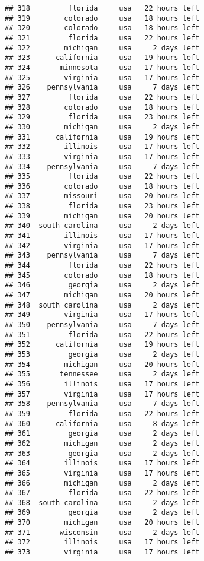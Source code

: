 \documentclass[
]{article}
\begin{document}
\begin{verbatim}
## 318         florida     usa   22 hours left
## 319        colorado     usa   18 hours left
## 320        colorado     usa   18 hours left
## 321         florida     usa   22 hours left
## 322        michigan     usa     2 days left
## 323      california     usa   19 hours left
## 324       minnesota     usa   17 hours left
## 325        virginia     usa   17 hours left
## 326    pennsylvania     usa     7 days left
## 327         florida     usa   22 hours left
## 328        colorado     usa   18 hours left
## 329         florida     usa   23 hours left
## 330        michigan     usa     2 days left
## 331      california     usa   19 hours left
## 332        illinois     usa   17 hours left
## 333        virginia     usa   17 hours left
## 334    pennsylvania     usa     7 days left
## 335         florida     usa   22 hours left
## 336        colorado     usa   18 hours left
## 337        missouri     usa   20 hours left
## 338         florida     usa   23 hours left
## 339        michigan     usa   20 hours left
## 340  south carolina     usa     2 days left
## 341        illinois     usa   17 hours left
## 342        virginia     usa   17 hours left
## 343    pennsylvania     usa     7 days left
## 344         florida     usa   22 hours left
## 345        colorado     usa   18 hours left
## 346         georgia     usa     2 days left
## 347        michigan     usa   20 hours left
## 348  south carolina     usa     2 days left
## 349        virginia     usa   17 hours left
## 350    pennsylvania     usa     7 days left
## 351         florida     usa   22 hours left
## 352      california     usa   19 hours left
## 353         georgia     usa     2 days left
## 354        michigan     usa   20 hours left
## 355       tennessee     usa     2 days left
## 356        illinois     usa   17 hours left
## 357        virginia     usa   17 hours left
## 358    pennsylvania     usa     7 days left
## 359         florida     usa   22 hours left
## 360      california     usa     8 days left
## 361         georgia     usa     2 days left
## 362        michigan     usa     2 days left
## 363         georgia     usa     2 days left
## 364        illinois     usa   17 hours left
## 365        virginia     usa   17 hours left
## 366        michigan     usa     2 days left
## 367         florida     usa   22 hours left
## 368  south carolina     usa     2 days left
## 369         georgia     usa     2 days left
## 370        michigan     usa   20 hours left
## 371       wisconsin     usa     2 days left
## 372        illinois     usa   17 hours left
## 373        virginia     usa   17 hours left

\end{verbatim}
\end{document}
